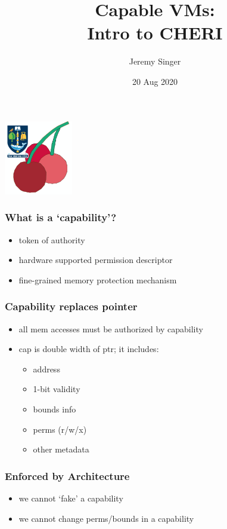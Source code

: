 \documentclass[20pt]{beamer}
\title{Capable VMs:\\ Intro to CHERI}
\author{Jeremy Singer}
\date{20 Aug 2020}
\begin{document}
\begin{frame}
  \includegraphics[width=3cm]{logo.png}
  \titlepage

\end{frame}

\begin{frame}
  \frametitle{What is a `capability'?}

  \begin{itemize}
  \item token of authority
  \item hardware supported permission descriptor
  \item fine-grained memory protection mechanism
  \end{itemize}
\end{frame}

\begin{frame}
  \frametitle{Capability replaces pointer}

  \begin{itemize}
  \item all mem accesses must be authorized by capability
  \item cap is double width of ptr; it includes:
    \begin{itemize}
    \item address
    \item 1-bit validity
    \item bounds info
    \item perms (r/w/x)
    \item other metadata
    \end{itemize}
  \end{itemize}
\end{frame}

\begin{frame}
  \frametitle{Enforced by Architecture}

  \begin{itemize}
  \item we cannot `fake' a capability
  \item we cannot change perms/bounds in a capability
  \end{itemize}
\end{frame}
\end{document}
